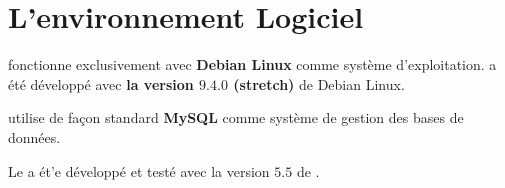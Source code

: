 \chapter{L'environnement Logiciel}\label{chap:environement-logiciel-requis}



\yeroth fonctionne exclusivement avec \textbf{Debian Linux}
comme syst\`eme d'exploitation.
\yeroth a \'et\'e d\'evelopp\'e avec \textbf{la version
$\mathbf{9.4.0}$ (stretch)} de Debian Linux.


\label{sec:yeren-sgbd}

\yeroth utilise de fa\c{c}on standard \textbf{MySQL} comme
syst\`eme de gestion des bases de donn\'ees.


Le \pos \yeroth a \'et'e d\'evelopp\'e et test\'e avec
la version $5.5$ de \mysql.


